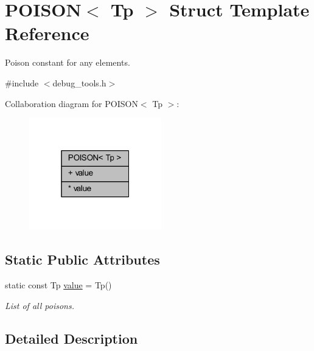 \hypertarget{struct_p_o_i_s_o_n}{}\section{P\+O\+I\+S\+ON$<$ Tp $>$ Struct Template Reference}
\label{struct_p_o_i_s_o_n}


Poison constant for any elements.  




{\ttfamily \#include $<$debug\+\_\+tools.\+h$>$}



Collaboration diagram for P\+O\+I\+S\+ON$<$ Tp $>$\+:
\nopagebreak
\begin{figure}[H]
\begin{center}
\leavevmode
\includegraphics[width=163pt]{struct_p_o_i_s_o_n__coll__graph}
\end{center}
\end{figure}
\subsection*{Static Public Attributes}
\textbf{ }\par
\begin{DoxyCompactItemize}
\item 
\mbox{\label{struct_p_o_i_s_o_n_a75c30e11745e5ccf77df2b30ad3bb1f3}} 
static const Tp \hyperlink{struct_p_o_i_s_o_n_a75c30e11745e5ccf77df2b30ad3bb1f3}{value} = Tp()
\begin{DoxyCompactList}\small\item\em List of all poisons. \end{DoxyCompactList}\end{DoxyCompactItemize}



\subsection{Detailed Description}
